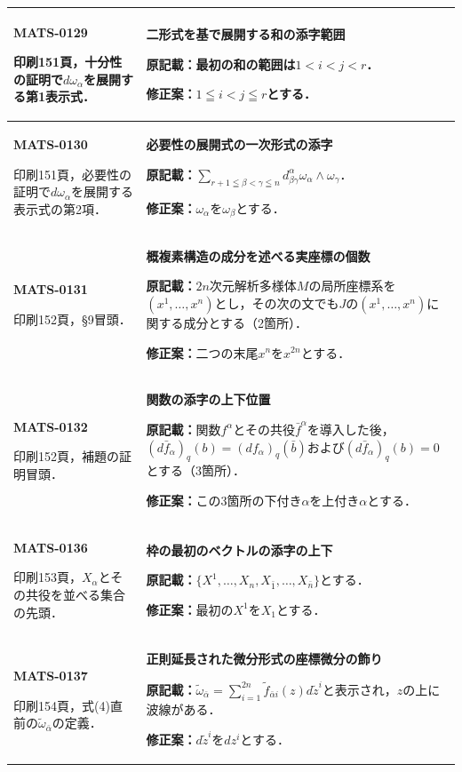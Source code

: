 \documentclass[a4paper,10pt]{ltjsarticle}
\begin{document}
\begin{longtable}{@{}>{\raggedright\arraybackslash}p{.19\linewidth}>{\raggedright\arraybackslash}p{.77\linewidth}@{}}
\hline
\hypertarget{MATS-0129}{}\textbf{MATS-0129}\par 印刷151頁，十分性の証明で$d\omega_\alpha$を展開する第1表示式． & \textbf{二形式を基で展開する和の添字範囲}\par\textbf{原記載：}最初の和の範囲は$1<i<j<r$．\par\textbf{修正案：}$1\leqq i<j\leqq r$とする． \\[3pt]
\hline
\hypertarget{MATS-0130}{}\textbf{MATS-0130}\par 印刷151頁，必要性の証明で$d\omega_\alpha$を展開する表示式の第2項． & \textbf{必要性の展開式の一次形式の添字}\par\textbf{原記載：}$\sum_{r+1\leqq\beta<\gamma\leqq n}d_{\beta\gamma}^\alpha\omega_\alpha\wedge\omega_\gamma$．\par\textbf{修正案：}$\omega_\alpha$を$\omega_\beta$とする． \\[3pt]
\hline
\hypertarget{MATS-0131}{}\textbf{MATS-0131}\par 印刷152頁，§9冒頭． & \textbf{概複素構造の成分を述べる実座標の個数}\par\textbf{原記載：}$2n$次元解析多様体$M$の局所座標系を$(x^1,\ldots,x^n)$とし，その次の文でも$J$の$(x^1,\ldots,x^n)$に関する成分とする（2箇所）．\par\textbf{修正案：}二つの末尾$x^n$を$x^{2n}$とする． \\[3pt]
\hline
\hypertarget{MATS-0132}{}\textbf{MATS-0132}\par 印刷152頁，補題の証明冒頭． & \textbf{関数の添字の上下位置}\par\textbf{原記載：}関数$f^\alpha$とその共役$\bar f^\alpha$を導入した後，$(d\bar f_\alpha)_q(b)=(df_\alpha)_q(\bar b)$および$(d\bar f_\alpha)_q(b)=0$とする（3箇所）．\par\textbf{修正案：}この3箇所の下付き$\alpha$を上付き$\alpha$とする． \\[3pt]
\hline
\hypertarget{MATS-0136}{}\textbf{MATS-0136}\par 印刷153頁，$X_\alpha$とその共役を並べる集合の先頭． & \textbf{枠の最初のベクトルの添字の上下}\par\textbf{原記載：}$\{X^1,\ldots,X_n,X_{\bar1},\ldots,X_{\bar n}\}$とする．\par\textbf{修正案：}最初の$X^1$を$X_1$とする． \\[3pt]
\hline
\hypertarget{MATS-0137}{}\textbf{MATS-0137}\par 印刷154頁，式(4)直前の$\tilde\omega_{\bar\alpha}$の定義． & \textbf{正則延長された微分形式の座標微分の飾り}\par\textbf{原記載：}$\tilde\omega_{\bar\alpha}=\sum_{i=1}^{2n}\tilde f_{\bar\alpha i}(z)d\tilde z^i$と表示され，$z$の上に波線がある．\par\textbf{修正案：}$d\tilde z^i$を$dz^i$とする． \\[3pt]

\end{longtable}
\end{document}
